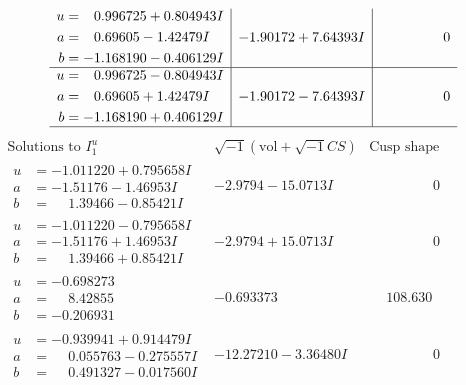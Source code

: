 \documentclass[1p]{elsarticle_modified}
\theoremstyle{definition}
\newcommand{\I}{\sqrt{-1}}
\begin{document}
$$\begin{array}{c|c|c}
\begin{aligned}
u &= \phantom{-}0.996725 + 0.804943 I \\
a &= \phantom{-}0.69605 - 1.42479 I \\
b &= -1.168190 - 0.406129 I\end{aligned}
 & -1.90172 + 7.64393 I & \phantom{-0.000000 } 0 \\ \hline\begin{aligned}
u &= \phantom{-}0.996725 - 0.804943 I \\
a &= \phantom{-}0.69605 + 1.42479 I \\
b &= -1.168190 + 0.406129 I\end{aligned}
 & -1.90172 - 7.64393 I & \phantom{-0.000000 } 0\\
 \hline 
 \end{array}$$\newpage$$\begin{array}{c|c|c}  
\text{Solutions to }I^u_{1}& \I (\text{vol} + \sqrt{-1}CS) & \text{Cusp shape}\\
 \hline 
\begin{aligned}
u &= -1.011220 + 0.795658 I \\
a &= -1.51176 - 1.46953 I \\
b &= \phantom{-}1.39466 - 0.85421 I\end{aligned}
 & -2.9794 - 15.0713 I & \phantom{-0.000000 } 0 \\ \hline\begin{aligned}
u &= -1.011220 - 0.795658 I \\
a &= -1.51176 + 1.46953 I \\
b &= \phantom{-}1.39466 + 0.85421 I\end{aligned}
 & -2.9794 + 15.0713 I & \phantom{-0.000000 } 0 \\ \hline\begin{aligned}
u &= -0.698273\phantom{ +0.000000I} \\
a &= \phantom{-}8.42855\phantom{ +0.000000I} \\
b &= -0.206931\phantom{ +0.000000I}\end{aligned}
 & -0.693373\phantom{ +0.000000I} & \phantom{-}108.630\phantom{ +0.000000I} \\ \hline\begin{aligned}
u &= -0.939941 + 0.914479 I \\
a &= \phantom{-}0.055763 - 0.275557 I \\
b &= \phantom{-}0.491327 - 0.017560 I\end{aligned}
 & -12.27210 - 3.36480 I & \phantom{-0.000000 } 0 \\ \hline\begin{aligned}

\end{aligned}
\end{array}$$
\end{document}
